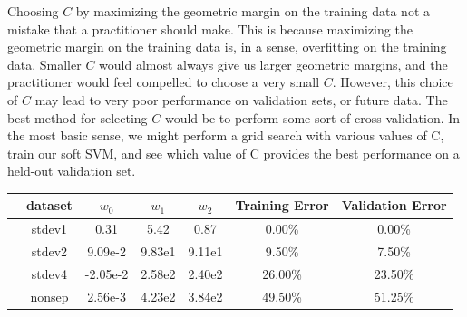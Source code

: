 \documentclass[10pt]{article}
\begin{document}
Choosing $C$ by maximizing the geometric margin on the training data not a mistake that a practitioner should make. This is because maximizing the geometric margin on the training data is, in a sense, overfitting on the training data. Smaller $C$ would almost always give us larger geometric margins, and the practitioner would feel compelled to choose a very small $C$. However, this choice of $C$ may lead to very poor performance on validation sets, or future data. The best method for selecting $C$ would be to perform some sort of cross-validation. In the most basic sense, we might perform a grid search with various values of C, train our soft SVM, and see which value of C provides the best performance on a held-out validation set.



\begin{table}
\centering
{}
\begin{tabular}{c c|c|c|c|c|c}
\toprule
{} & dataset & $w_0$ & $w_1$ & $w_2$ & Training Error & Validation Error \\
\midrule
  & stdev1 & 0.31 & 5.42 & 0.87 & 0.00\% & 0.00\% \\
  & stdev2 & 9.09e-2 & 9.83e1 & 9.11e1 & 9.50\% & 7.50\% \\
  & stdev4 & -2.05e-2 & 2.58e2 & 2.40e2 & 26.00\% & 23.50\% \\
  & nonsep & 2.56e-3 & 4.23e2 & 3.84e2 & 49.50\% & 51.25\% \\
\bottomrule
\end{tabular}
\end{table}
\end{document}
